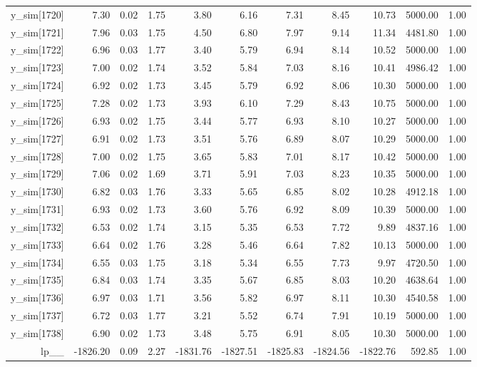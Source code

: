 \begin{table}[ht]
\begin{tabular}{rrrrrrrrrrr}
  y\_sim[1720] & 7.30 & 0.02 & 1.75 & 3.80 & 6.16 & 7.31 & 8.45 & 10.73 & 5000.00 & 1.00 \\ 
  y\_sim[1721] & 7.96 & 0.03 & 1.75 & 4.50 & 6.80 & 7.97 & 9.14 & 11.34 & 4481.80 & 1.00 \\ 
  y\_sim[1722] & 6.96 & 0.03 & 1.77 & 3.40 & 5.79 & 6.94 & 8.14 & 10.52 & 5000.00 & 1.00 \\ 
  y\_sim[1723] & 7.00 & 0.02 & 1.74 & 3.52 & 5.84 & 7.03 & 8.16 & 10.41 & 4986.42 & 1.00 \\ 
  y\_sim[1724] & 6.92 & 0.02 & 1.73 & 3.45 & 5.79 & 6.92 & 8.06 & 10.30 & 5000.00 & 1.00 \\ 
  y\_sim[1725] & 7.28 & 0.02 & 1.73 & 3.93 & 6.10 & 7.29 & 8.43 & 10.75 & 5000.00 & 1.00 \\ 
  y\_sim[1726] & 6.93 & 0.02 & 1.75 & 3.44 & 5.77 & 6.93 & 8.10 & 10.27 & 5000.00 & 1.00 \\ 
  y\_sim[1727] & 6.91 & 0.02 & 1.73 & 3.51 & 5.76 & 6.89 & 8.07 & 10.29 & 5000.00 & 1.00 \\ 
  y\_sim[1728] & 7.00 & 0.02 & 1.75 & 3.65 & 5.83 & 7.01 & 8.17 & 10.42 & 5000.00 & 1.00 \\ 
  y\_sim[1729] & 7.06 & 0.02 & 1.69 & 3.71 & 5.91 & 7.03 & 8.23 & 10.35 & 5000.00 & 1.00 \\ 
  y\_sim[1730] & 6.82 & 0.03 & 1.76 & 3.33 & 5.65 & 6.85 & 8.02 & 10.28 & 4912.18 & 1.00 \\ 
  y\_sim[1731] & 6.93 & 0.02 & 1.73 & 3.60 & 5.76 & 6.92 & 8.09 & 10.39 & 5000.00 & 1.00 \\ 
  y\_sim[1732] & 6.53 & 0.02 & 1.74 & 3.15 & 5.35 & 6.53 & 7.72 & 9.89 & 4837.16 & 1.00 \\ 
  y\_sim[1733] & 6.64 & 0.02 & 1.76 & 3.28 & 5.46 & 6.64 & 7.82 & 10.13 & 5000.00 & 1.00 \\ 
  y\_sim[1734] & 6.55 & 0.03 & 1.75 & 3.18 & 5.34 & 6.55 & 7.73 & 9.97 & 4720.50 & 1.00 \\ 
  y\_sim[1735] & 6.84 & 0.03 & 1.74 & 3.35 & 5.67 & 6.85 & 8.03 & 10.20 & 4638.64 & 1.00 \\ 
  y\_sim[1736] & 6.97 & 0.03 & 1.71 & 3.56 & 5.82 & 6.97 & 8.11 & 10.30 & 4540.58 & 1.00 \\ 
  y\_sim[1737] & 6.72 & 0.03 & 1.77 & 3.21 & 5.52 & 6.74 & 7.91 & 10.19 & 5000.00 & 1.00 \\ 
  y\_sim[1738] & 6.90 & 0.02 & 1.73 & 3.48 & 5.75 & 6.91 & 8.05 & 10.30 & 5000.00 & 1.00 \\ 
  lp\_\_ & -1826.20 & 0.09 & 2.27 & -1831.76 & -1827.51 & -1825.83 & -1824.56 & -1822.76 & 592.85 & 1.00 \\ 
   \hline
\end{tabular}
\end{table}
